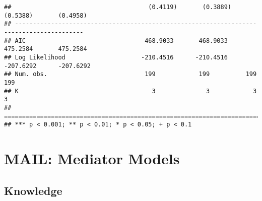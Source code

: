 \documentclass[
]{article}
\begin{document}
\begin{verbatim}
##                                      (0.4119)       (0.3889)     (0.5388)       (0.4958) 
## -----------------------------------------------------------------------------------------
## AIC                                 468.9033       468.9033     475.2584       475.2584  
## Log Likelihood                     -210.4516      -210.4516    -207.6292      -207.6292  
## Num. obs.                           199            199          199            199       
## K                                     3              3            3              3       
## =========================================================================================
## *** p < 0.001; ** p < 0.01; * p < 0.05; + p < 0.1
\end{verbatim}

\hypertarget{mail-mediator-models}{%
\section{MAIL: Mediator Models}\label{mail-mediator-models}}

\hypertarget{knowledge-1}{%
\subsection{Knowledge}\label{knowledge-1}}
\end{document}
